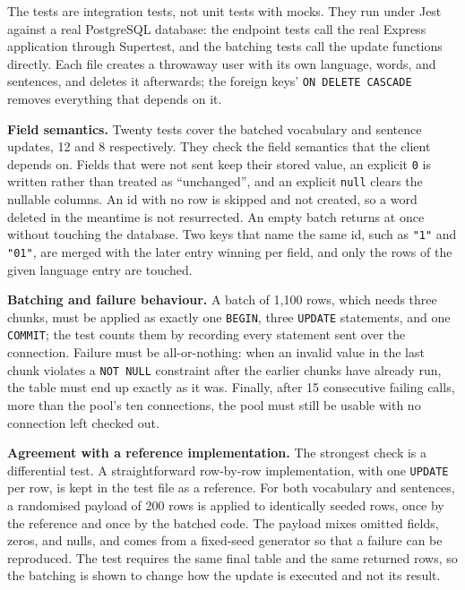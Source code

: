    The tests are integration tests, not unit tests with mocks. They run under Jest against a real PostgreSQL database: the endpoint tests call the real Express application through Supertest, and the batching tests call the update functions directly. Each file creates a throwaway user with its own language, words, and sentences, and deletes it afterwards; the foreign keys' \texttt{ON DELETE CASCADE} removes everything that depends on it.

    \begin{sloppypar}
    \textbf{Field semantics.} Twenty tests cover the batched vocabulary and sentence updates, 12 and 8 respectively. They check the field semantics that the client depends on. Fields that were not sent keep their stored value, an explicit \texttt{0} is written rather than treated as ``unchanged'', and an explicit \texttt{null} clears the nullable columns. An id with no row is skipped and not created, so a word deleted in the meantime is not resurrected. An empty batch returns at once without touching the database. Two keys that name the same id, such as \texttt{"1"} and \texttt{"01"}, are merged with the later entry winning per field, and only the rows of the given language entry are touched.
    \end{sloppypar}

    \begin{sloppypar}
    \textbf{Batching and failure behaviour.} A batch of 1{,}100 rows, which needs three chunks, must be applied as exactly one \texttt{BEGIN}, three \texttt{UPDATE} statements, and one \texttt{COMMIT}; the test counts them by recording every statement sent over the connection. Failure must be all-or-nothing: when an invalid value in the last chunk violates a \texttt{NOT NULL} constraint after the earlier chunks have already run, the table must end up exactly as it was. Finally, after 15 consecutive failing calls, more than the pool's ten connections, the pool must still be usable with no connection left checked out.
    \end{sloppypar}

    \begin{sloppypar}
    \textbf{Agreement with a reference implementation.} The strongest check is a differential test. A straightforward row-by-row implementation, with one \texttt{UPDATE} per row, is kept in the test file as a reference. For both vocabulary and sentences, a randomised payload of 200 rows is applied to identically seeded rows, once by the reference and once by the batched code. The payload mixes omitted fields, zeros, and nulls, and comes from a fixed-seed generator so that a failure can be reproduced. The test requires the same final table and the same returned rows, so the batching is shown to change how the update is executed and not its result.
    \end{sloppypar}

